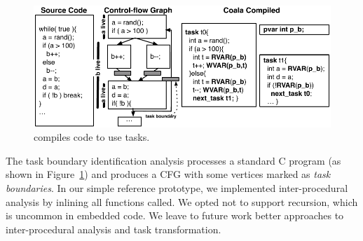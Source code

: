 %
%


\begin{figure}
	\centering
	\includegraphics[width=\columnwidth]{figures/compiler.pdf}
	\caption{\sys compiles code to use tasks.}
	\label{fig:compiler_overview}
\end{figure}

The task boundary identification analysis processes a standard C program (as
shown in Figure~\ref{fig:compiler_overview}) and produces a CFG with some
vertices marked as {\em task boundaries}. In our simple
reference prototype, we implemented inter-procedural analysis by inlining all
functions called.  We opted not to support recursion, which is uncommon in
embedded code. We leave to future work better approaches to inter-procedural
analysis and task transformation.
 
